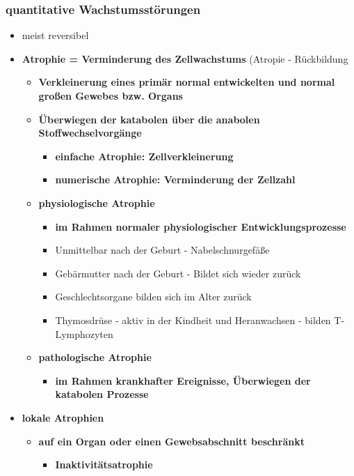 \subsubsection{quantitative Wachstumsstörungen}
	\begin{itemize}
		\item meist reversibel
		\item \textbf{Atrophie = Verminderung des Zellwachstums} (Atropie - Rückbildung
			\begin{itemize}
				\item \textbf{Verkleinerung eines primär normal entwickelten und normal großen Gewebes bzw. Organs}
				\item \textbf{Überwiegen der katabolen über die anabolen Stoffwechselvorgänge}
					\begin{itemize}
						\item \textbf{einfache Atrophie: Zellverkleinerung}
						\item \textbf{numerische Atrophie: Verminderung der Zellzahl}
					\end{itemize}
				\item \textbf{physiologische Atrophie}
					\begin{itemize}
						\item \textbf{im Rahmen normaler physiologischer Entwicklungsprozesse}
						\item Unmittelbar nach der Geburt - Nabelschnurgefäße
						\item Gebärmutter nach der Geburt - Bildet sich wieder zurück
						\item Geschlechtsorgane bilden sich im Alter zurück
						\item Thymosdrüse - aktiv in der Kindheit und Heranwachsen - bilden T-Lymphozyten
					\end{itemize}
				\item \textbf{pathologische Atrophie}
					\begin{itemize}
						\item \textbf{im Rahmen krankhafter Ereignisse, Überwiegen der katabolen Prozesse}
					\end{itemize}
			\end{itemize}
		\item \textbf{lokale Atrophien}
			\begin{itemize}
				\item \textbf{auf ein Organ oder einen Gewebsabschnitt beschränkt}
					\begin{itemize}
						\item \textbf{Inaktivitätsatrophie}

\end{itemize}
\end{itemize}
\end{itemize}
